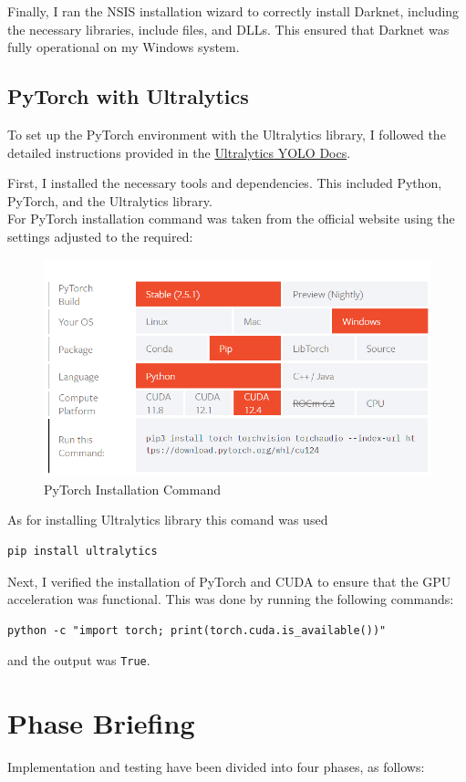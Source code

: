 Finally, I ran the NSIS installation wizard to correctly install Darknet, including the necessary libraries, include files, and DLLs. This ensured that Darknet was fully operational on my Windows system.

\subsection{PyTorch with Ultralytics}

To set up the PyTorch environment with the Ultralytics library, I followed the detailed instructions provided in the \href{https://docs.ultralytics.com/quickstart/}{Ultralytics YOLO Docs}. 

First, I installed the necessary tools and dependencies. This included Python, PyTorch, and the Ultralytics library. 
\\
For PyTorch installation command was taken from the official website using the settings adjusted to the required:
\begin{figure}[H]
    \centering
    \includegraphics[width=0.8\linewidth]{figures/pytorch.png}
    \caption{PyTorch Installation Command}
    \label{fig:enter-label}
\end{figure}
As for installing Ultralytics library this comand was used
\begin{verbatim}
pip install ultralytics
\end{verbatim}

Next, I verified the installation of PyTorch and CUDA to ensure that the GPU acceleration was functional. This was done by running the following commands:

\begin{verbatim}
python -c "import torch; print(torch.cuda.is_available())"
\end{verbatim}

and the output was \texttt{True}.

\section{Phase Briefing}  
Implementation and testing have been divided into four phases, as follows:  

